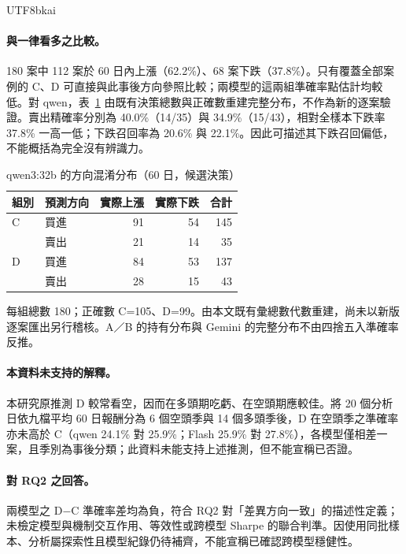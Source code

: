 \documentclass[12pt,a4paper]{article}
\newcommand{\grp}[1]{\textsf{#1}}
\begin{document}
\begin{CJK}{UTF8}{bkai}
\paragraph{與一律看多之比較。} 180 案中 112 案於 60 日內上漲（62.2\%）、68 案下跌（37.8\%）。只有覆蓋全部案例的 \grp{C}、\grp{D} 可直接與此事後方向參照比較；兩模型的這兩組準確率點估計均較低。對 qwen，表~\ref{tab:confusion} 由既有決策總數與正確數重建完整分布，不作為新的逐案驗證。賣出精確率分別為 40.0\%（14/35）與 34.9\%（15/43），相對全樣本下跌率 37.8\% 一高一低；下跌召回率為 20.6\% 與 22.1\%。因此可描述其下跌召回偏低，不能概括為完全沒有辨識力。

\begin{table}[H]
\centering\small
\caption{qwen3:32b 的方向混淆分布（60 日，候選決策）}
\label{tab:confusion}
\begin{tabular}{@{}llrrr@{}}
\toprule
組別 & 預測方向 & 實際上漲 & 實際下跌 & 合計 \\
\midrule
\grp{C} & 買進 & 91 & 54 & 145 \\
         & 賣出 & 21 & 14 & 35 \\
\grp{D} & 買進 & 84 & 53 & 137 \\
         & 賣出 & 28 & 15 & 43 \\
\bottomrule
\end{tabular}
\par\smallskip
\raggedright\footnotesize 每組總數 180；正確數 C=105、D=99。由本文既有彙總數代數重建，尚未以新版逐案匯出另行稽核。A／B 的持有分布與 Gemini 的完整分布不由四捨五入準確率反推。
\end{table}

\paragraph{本資料未支持的解釋。} 本研究原推測 \grp{D} 較常看空，因而在多頭期吃虧、在空頭期應較佳。將 20 個分析日依九檔平均 60 日報酬分為 6 個空頭季與 14 個多頭季後，\grp{D} 在空頭季之準確率亦未高於 \grp{C}（qwen 24.1\% 對 25.9\%；Flash 25.9\% 對 27.8\%），各模型僅相差一案，且季別為事後分類；此資料未能支持上述推測，但不能宣稱已否證。

\paragraph{對 RQ2 之回答。} 兩模型之 \grp{D}$-$\grp{C} 準確率差均為負，符合 RQ2 對「差異方向一致」的描述性定義；未檢定模型與機制交互作用、等效性或跨模型 Sharpe 的聯合判準。因使用同批樣本、分析屬探索性且模型紀錄仍待補齊，不能宣稱已確認跨模型穩健性。


\end{CJK}
\end{document}
